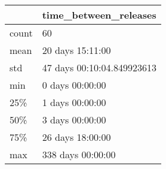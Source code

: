 \begin{tabular}{ll}
\toprule
 & time\_between\_releases \\
\midrule
count & 60 \\
mean & 20 days 15:11:00 \\
std & 47 days 00:10:04.849923613 \\
min & 0 days 00:00:00 \\
25\% & 1 days 00:00:00 \\
50\% & 3 days 00:00:00 \\
75\% & 26 days 18:00:00 \\
max & 338 days 00:00:00 \\
\bottomrule
\end{tabular}
